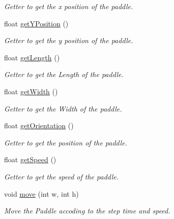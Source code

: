 \begin{DoxyCompactItemize}
\begin{DoxyCompactList}\small\item\em Getter to get the x position of the paddle. \end{DoxyCompactList}\item 
\hypertarget{classPlayer_adb0156f686b1aa98f74dc8db0d6305ee}{float \hyperlink{classPlayer_adb0156f686b1aa98f74dc8db0d6305ee}{get\+Y\+Position} ()}\label{classPlayer_adb0156f686b1aa98f74dc8db0d6305ee}

\begin{DoxyCompactList}\small\item\em Getter to get the y position of the paddle. \end{DoxyCompactList}\item 
\hypertarget{classPlayer_ae10f3a8d97b0a6fa3a3a6761c0337ab7}{float \hyperlink{classPlayer_ae10f3a8d97b0a6fa3a3a6761c0337ab7}{get\+Length} ()}\label{classPlayer_ae10f3a8d97b0a6fa3a3a6761c0337ab7}

\begin{DoxyCompactList}\small\item\em Getter to get the Length of the paddle. \end{DoxyCompactList}\item 
\hypertarget{classPlayer_a5317c44d9a85a1b25435edf74c0994e9}{float \hyperlink{classPlayer_a5317c44d9a85a1b25435edf74c0994e9}{get\+Width} ()}\label{classPlayer_a5317c44d9a85a1b25435edf74c0994e9}

\begin{DoxyCompactList}\small\item\em Getter to get the Width of the paddle. \end{DoxyCompactList}\item 
\hypertarget{classPlayer_aeb38adafb5e2ef723021225410e20668}{float \hyperlink{classPlayer_aeb38adafb5e2ef723021225410e20668}{get\+Orientation} ()}\label{classPlayer_aeb38adafb5e2ef723021225410e20668}

\begin{DoxyCompactList}\small\item\em Getter to get the position of the paddle. \end{DoxyCompactList}\item 
\hypertarget{classPlayer_a63caffe9c0cbb3b776811ad45a545aa9}{float \hyperlink{classPlayer_a63caffe9c0cbb3b776811ad45a545aa9}{get\+Speed} ()}\label{classPlayer_a63caffe9c0cbb3b776811ad45a545aa9}

\begin{DoxyCompactList}\small\item\em Getter to get the speed of the paddle. \end{DoxyCompactList}\item 
void \hyperlink{classPlayer_a981b84ed6dba35c941685b74c8ca5feb}{move} (int w, int h)
\begin{DoxyCompactList}\small\item\em Move the Paddle accoding to the step time and speed. \end{DoxyCompactList}\end{DoxyCompactItemize}


